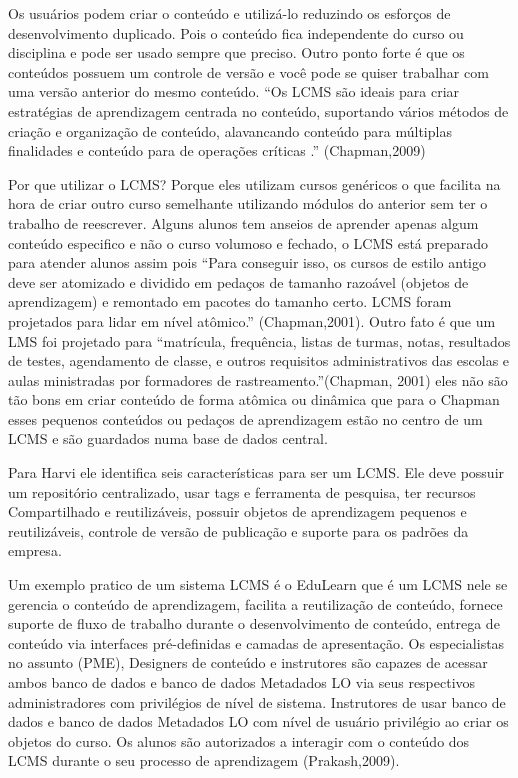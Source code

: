 \documentclass[12pt]{article}
\begin{document}
Os usuários podem criar o conteúdo e utilizá-lo reduzindo os esforços de desenvolvimento duplicado. Pois o conteúdo fica independente do curso 
ou disciplina e pode ser usado sempre que preciso. Outro ponto forte é que os conteúdos possuem um controle de versão e você pode se quiser 
trabalhar com uma versão anterior do mesmo conteúdo. “Os LCMS são ideais para criar estratégias de aprendizagem centrada no conteúdo, suportando 
vários métodos de criação e organização de conteúdo, alavancando conteúdo para múltiplas finalidades e conteúdo para de operações críticas .” 
(Chapman,2009)

Por que utilizar o LCMS? Porque eles utilizam cursos genéricos o que facilita na hora de criar outro curso semelhante utilizando módulos do 
anterior sem ter o trabalho de reescrever. Alguns alunos tem anseios de aprender apenas algum conteúdo especifico e não o curso volumoso e fechado, 
o LCMS está preparado para atender alunos assim pois “Para conseguir isso, os cursos de estilo antigo deve ser atomizado e dividido em pedaços de 
tamanho razoável (objetos de aprendizagem) e remontado em pacotes do tamanho certo. LCMS foram projetados para lidar em nível atômico.” (Chapman,2001). Outro fato é que um LMS foi projetado para “matrícula, frequência, listas de turmas, notas, resultados de testes, agendamento de classe, e outros requisitos administrativos das escolas e aulas ministradas por formadores de rastreamento.”(Chapman, 2001) eles não são tão bons em criar conteúdo de forma atômica ou dinâmica que para o Chapman esses pequenos conteúdos ou pedaços de aprendizagem estão no centro de um LCMS e são guardados numa base de dados central.

Para Harvi ele identifica seis características para ser um LCMS. Ele deve possuir um repositório centralizado, usar tags e ferramenta de pesquisa, 
ter recursos Compartilhado e reutilizáveis, possuir objetos de aprendizagem pequenos e reutilizáveis, controle de versão de publicação e suporte 
para os padrões da empresa.


Um exemplo pratico de um sistema LCMS é o EduLearn que é um LCMS nele se gerencia o conteúdo de aprendizagem, facilita a reutilização de conteúdo, 
fornece suporte de fluxo de trabalho durante o desenvolvimento de conteúdo, entrega de conteúdo via interfaces pré-definidas e camadas de 
apresentação. Os especialistas no assunto (PME), Designers de conteúdo e instrutores são capazes de acessar ambos banco de dados e banco de dados 
Metadados LO via seus respectivos administradores com privilégios de nível de sistema. Instrutores de usar banco de dados e banco de dados 
Metadados LO com nível de usuário privilégio ao criar os objetos do curso. Os alunos são autorizados a interagir com o conteúdo dos LCMS durante o 
seu processo de aprendizagem (Prakash,2009).
\end{document}
